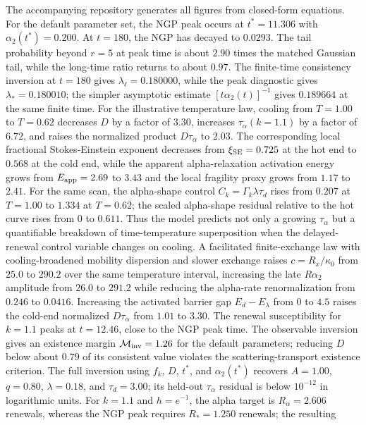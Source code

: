 \documentclass[aps,preprint,onecolumn,superscriptaddress,nofootinbib]{revtex4-2}
\begin{document}
The accompanying repository generates all figures from closed-form equations.
For the default parameter set, the NGP peak occurs at $t^\ast=11.306$ with
$\alpha_2(t^\ast)=0.200$. At $t=180$, the NGP has decayed to $0.0293$. The
tail probability beyond $r=5$ at peak time is about $2.90$ times the matched
Gaussian tail, while the long-time ratio returns to about $0.97$. The
finite-time consistency inversion at $t=180$ gives
$\lambda_\ell=0.180000$, while the peak diagnostic gives
$\lambda_\ast=0.180010$; the simpler asymptotic estimate
$[t\alpha_2(t)]^{-1}$ gives $0.189664$ at the same finite time.
For the illustrative temperature law, cooling from $T=1.00$ to $T=0.62$
decreases $D$ by a factor of $3.30$, increases $\tau_\alpha(k=1.1)$ by a
factor of $6.72$, and raises the normalized product $D\tau_\alpha$ to $2.03$.
The corresponding local fractional Stokes-Einstein exponent decreases from
$\xi_{\rm SE}=0.725$ at the hot end to $0.568$ at the cold end, while the
apparent alpha-relaxation activation energy grows from $E_{\rm app}=2.69$ to
$3.43$ and the local fragility proxy grows from $1.17$ to $2.41$.
For the same scan, the alpha-shape control $C_k=\Gamma_k\lambda\tau_d$ rises
from $0.207$ at $T=1.00$ to $1.334$ at $T=0.62$; the scaled alpha-shape
residual relative to the hot curve rises from $0$ to $0.611$. Thus the model
predicts not only a growing $\tau_\alpha$ but a quantifiable breakdown of
time-temperature superposition when the delayed-renewal control variable
changes on cooling.
A facilitated finite-exchange law with cooling-broadened mobility dispersion
and slower exchange raises $c=R_x/\kappa_0$ from $25.0$ to $290.2$ over the same
temperature interval, increasing the late $R\alpha_2$ amplitude from $26.0$ to
$291.2$ while reducing the alpha-rate renormalization from $0.246$ to $0.0416$.
Increasing the activated barrier gap $E_d-E_\lambda$ from $0$ to $4.5$ raises
the cold-end normalized $D\tau_\alpha$ from $1.01$ to $3.30$. The renewal
susceptibility for $k=1.1$ peaks at $t=12.46$, close to the NGP peak time.
The observable inversion gives an existence margin
$\mathcal{M}_{\rm inv}=1.26$ for the default parameters; reducing $D$ below
about $0.79$ of its consistent value violates the scattering-transport
existence criterion.
The full inversion using $f_k$, $D$, $t^\ast$, and $\alpha_2(t^\ast)$ recovers
$A=1.00$, $q=0.80$, $\lambda=0.18$, and $\tau_d=3.00$; its held-out
$\tau_\alpha$ residual is below $10^{-12}$ in logarithmic units.
For $k=1.1$ and $h=e^{-1}$, the alpha target is $R_\alpha=2.606$ renewals,
whereas the NGP peak requires $R_\ast=1.250$ renewals; the resulting
\end{document}
